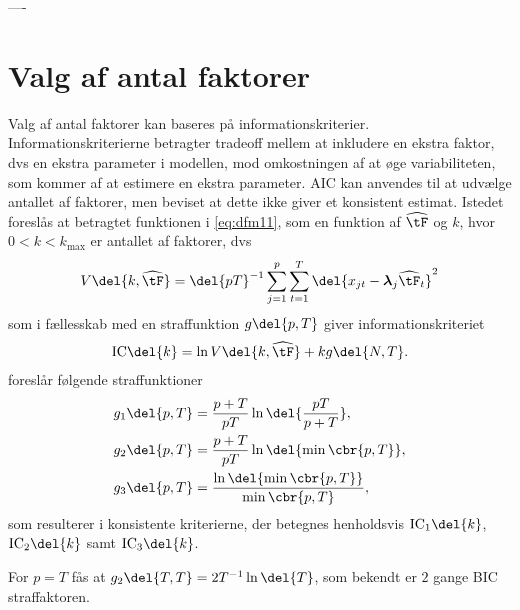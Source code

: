---- 

\section{Valg af antal faktorer}
%
Valg af antal faktorer kan baseres på informationskriterier.
Informationskriterierne betragter tradeoff mellem at inkludere en ekstra faktor, dvs en ekstra parameter i modellen, mod omkostningen af at øge variabiliteten, som kommer af at estimere en ekstra parameter.
AIC kan anvendes til at udvælge antallet af faktorer, men \citep{Bai_Ng} beviset at dette ikke giver et konsistent estimat.
Istedet foreslås at betragtet funktionen i \eqref{eq:dfm11}, som en funktion af \(\widehat{\tF}\) og \(k\), hvor \(0<k<k_\text{max}\) er antallet af faktorer, dvs
\begin{align*}
V \del{k, \widehat{\tF}} = \del{pT}^{-1} \sum_{j=1}^p \sum_{t=1}^T \del{x_{jt} -\boldsymbol{\lambda}_j \widehat{\tF}_t}^2
\end{align*}
som i fællesskab med en straffunktion \(g \del{p,T}\) giver informationskriteriet
\begin{align*}
\text{IC} \del{k} = \ln V \del{k, \widehat{\tF}} + k g \del{N,T}.
\end{align*}
\citep{Bai_Ng} foreslår følgende straffunktioner
\begin{align}
g_1 \del{p,T} &= \frac{p + T}{p T} \ln \del{\frac{pT}{p + T}}, \label{eq:ic1} \\
g_2 \del{p,T} &= \frac{p + T}{p T} \ln \del{ \min \cbr{p, T}}, \label{eq:ic2} \\
g_3 \del{p,T} &= \frac{\ln \del{\min \cbr{p, T}}}{\min \cbr{p, T}},\label{eq:ic3}
\end{align}
som resulterer i konsistente kriterierne, der betegnes henholdsvis \(\text{IC}_1 \del{k}\), \(\text{IC}_2 \del{k}\) samt \(\text{IC}_3 \del{k}\).

For \(p = T\) fås at \(g_2 \del{T,T} = 2T^{-1} \ln \del{T}\), som bekendt er \(2\) gange BIC straffaktoren.



